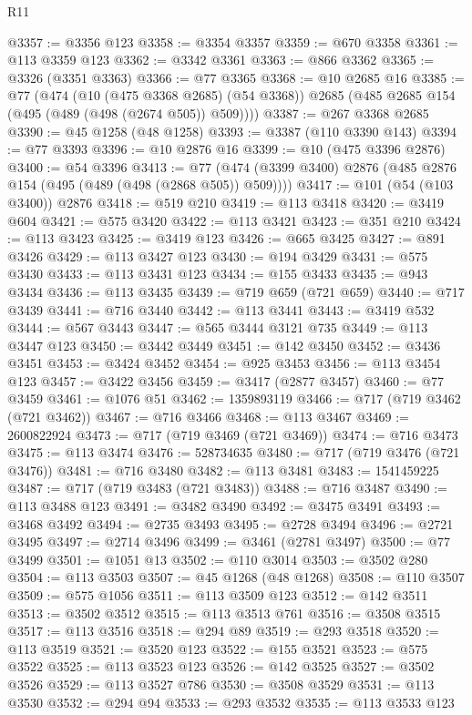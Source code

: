 \begin{lexlean}{R11}
\begin{coremodule}
@3357 := @3356 @123
@3358 := @3354 @3357
@3359 := @670 @3358
@3361 := @113 @3359 @123
@3362 := @3342 @3361
@3363 := @866 @3362
@3365 := @3326 (@3351 @3363)
@3366 := @77 @3365
@3368 := @10 @2685 @16
@3385 := @77
    (@474
      (@10 (@475 @3368 @2685) (@54 @3368))
      @2685
      (@485 @2685 @154 (@495 (@489 (@498 (@2674 @505)) @509))))
@3387 := @267 @3368 @2685
@3390 := @45 @1258 (@48 @1258)
@3393 := @3387 (@110 @3390 @143)
@3394 := @77 @3393
@3396 := @10 @2876 @16
@3399 := @10 (@475 @3396 @2876)
@3400 := @54 @3396
@3413 := @77 (@474 (@3399 @3400) @2876 (@485 @2876 @154 (@495 (@489 (@498 (@2868 @505)) @509))))
@3417 := @101 (@54 (@103 @3400)) @2876
@3418 := @519 @210
@3419 := @113 @3418
@3420 := @3419 @604
@3421 := @575 @3420
@3422 := @113 @3421
@3423 := @351 @210
@3424 := @113 @3423
@3425 := @3419 @123
@3426 := @665 @3425
@3427 := @891 @3426
@3429 := @113 @3427 @123
@3430 := @194 @3429
@3431 := @575 @3430
@3433 := @113 @3431 @123
@3434 := @155 @3433
@3435 := @943 @3434
@3436 := @113 @3435
@3439 := @719 @659 (@721 @659)
@3440 := @717 @3439
@3441 := @716 @3440
@3442 := @113 @3441
@3443 := @3419 @532
@3444 := @567 @3443
@3447 := @565 @3444 @3121 @735
@3449 := @113 @3447 @123
@3450 := @3442 @3449
@3451 := @142 @3450
@3452 := @3436 @3451
@3453 := @3424 @3452
@3454 := @925 @3453
@3456 := @113 @3454 @123
@3457 := @3422 @3456
@3459 := @3417 (@2877 @3457)
@3460 := @77 @3459
@3461 := @1076 @51
@3462 := 1359893119
@3466 := @717 (@719 @3462 (@721 @3462))
@3467 := @716 @3466
@3468 := @113 @3467
@3469 := 2600822924
@3473 := @717 (@719 @3469 (@721 @3469))
@3474 := @716 @3473
@3475 := @113 @3474
@3476 := 528734635
@3480 := @717 (@719 @3476 (@721 @3476))
@3481 := @716 @3480
@3482 := @113 @3481
@3483 := 1541459225
@3487 := @717 (@719 @3483 (@721 @3483))
@3488 := @716 @3487
@3490 := @113 @3488 @123
@3491 := @3482 @3490
@3492 := @3475 @3491
@3493 := @3468 @3492
@3494 := @2735 @3493
@3495 := @2728 @3494
@3496 := @2721 @3495
@3497 := @2714 @3496
@3499 := @3461 (@2781 @3497)
@3500 := @77 @3499
@3501 := @1051 @13
@3502 := @110 @3014
@3503 := @3502 @280
@3504 := @113 @3503
@3507 := @45 @1268 (@48 @1268)
@3508 := @110 @3507
@3509 := @575 @1056
@3511 := @113 @3509 @123
@3512 := @142 @3511
@3513 := @3502 @3512
@3515 := @113 @3513 @761
@3516 := @3508 @3515
@3517 := @113 @3516
@3518 := @294 @89
@3519 := @293 @3518
@3520 := @113 @3519
@3521 := @3520 @123
@3522 := @155 @3521
@3523 := @575 @3522
@3525 := @113 @3523 @123
@3526 := @142 @3525
@3527 := @3502 @3526
@3529 := @113 @3527 @786
@3530 := @3508 @3529
@3531 := @113 @3530
@3532 := @294 @94
@3533 := @293 @3532
@3535 := @113 @3533 @123

\end{coremodule}
\end{lexlean}

